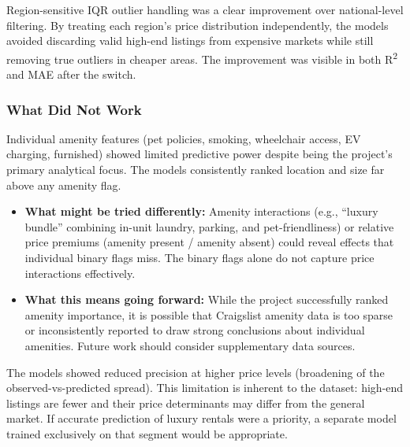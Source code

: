 \noindent
Region-sensitive IQR outlier handling was a clear improvement over national-level filtering. By treating each region's price distribution independently, the models avoided discarding valid high-end listings from expensive markets while still removing true outliers in cheaper areas. The improvement was visible in both R\textsuperscript{2} and MAE after the switch.

\subsubsection{What Did Not Work}
\noindent
Individual amenity features (pet policies, smoking, wheelchair access, EV charging, furnished) showed limited predictive power despite being the project's primary analytical focus. The models consistently ranked location and size far above any amenity flag.
\vspace{-12pt}
\begin{itemize}[itemsep=-9pt]
    \item \textbf{What might be tried differently:} Amenity interactions (e.g., ``luxury bundle'' combining in-unit laundry, parking, and pet-friendliness) or relative price premiums (amenity present / amenity absent) could reveal effects that individual binary flags miss. The binary flags alone do not capture price interactions effectively.
    \item \textbf{What this means going forward:} While the project successfully ranked amenity importance, it is possible that Craigslist amenity data is too sparse or inconsistently reported to draw strong conclusions about individual amenities. Future work should consider supplementary data sources.
\end{itemize}

\noindent
The models showed reduced precision at higher price levels (broadening of the observed-vs-predicted spread). This limitation is inherent to the dataset: high-end listings are fewer and their price determinants may differ from the general market. If accurate prediction of luxury rentals were a priority, a separate model trained exclusively on that segment would be appropriate.


